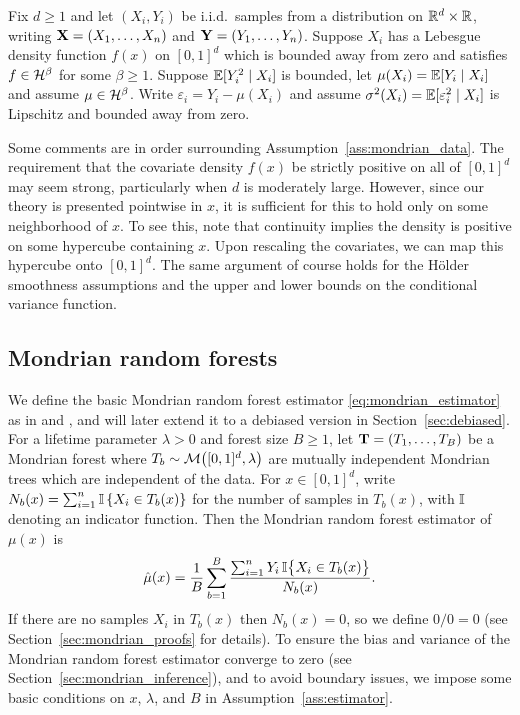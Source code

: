 \begin{assumption}%
  \label{ass:mondrian_data}

  Fix $d \geq 1$ and let $(X_i, Y_i)$ be i.i.d.\ samples from a distribution on
  $\mathbb{R}^d \times \mathbb{R}$, writing $\mathbf{X} = (X_1, \ldots, X_n)$ and
  $\mathbf{Y} = (Y_1, \ldots, Y_n)$. Suppose $X_i$ has a Lebesgue density function
  $f(x)$ on $[0,1]^d$ which is bounded away from zero and satisfies
  $f \in \mathcal{H}^\beta$ for some $\beta \geq 1$. Suppose $\mathbb{E}[Y_i^2 \mid X_i]$ is
  bounded, let $\mu(X_i) = \mathbb{E}[Y_i \mid X_i]$ and assume $\mu \in \mathcal{H}^\beta$.
  Write $\varepsilon_i = Y_i - \mu(X_i)$ and assume
  $\sigma^2(X_i) = \mathbb{E}[\varepsilon_i^2 \mid X_i]$
  is Lipschitz and bounded away from zero.

\end{assumption}

Some comments are in order surrounding Assumption~\ref{ass:mondrian_data}. The
requirement that the covariate density $f(x)$ be strictly positive on all of
$[0,1]^d$ may seem strong, particularly when $d$ is moderately large. However,
since our theory is presented pointwise in $x$, it is sufficient for this to
hold only on some neighborhood of $x$. To see this, note that continuity
implies the density is positive on some hypercube containing $x$. Upon
rescaling the covariates, we can map this hypercube onto $[0,1]^d$. The same
argument of course holds for the H{\"o}lder smoothness assumptions and the
upper and lower bounds on the conditional variance function.

\subsection{Mondrian random forests}

We define the basic Mondrian random forest estimator
\eqref{eq:mondrian_estimator} as in \citet{lakshminarayanan2014mondrian} and
\citet{mourtada2020minimax}, and will later extend it to a debiased version in
Section~\ref{sec:debiased}. For a lifetime parameter $\lambda > 0$ and forest
size $B \geq 1$, let $\mathbf{T} = (T_1, \ldots, T_B)$ be a Mondrian forest where
$T_b \sim \mathcal{M}\big([0,1]^d, \lambda\big)$ are mutually independent Mondrian trees
which are independent of the data. For $x \in [0,1]^d$, write
$N_b(x) = \sum_{i=1}^{n} \mathbb{I} \left\{ X_i \in T_b(x) \right\}$ for the number of
samples in $T_b(x)$, with $\mathbb{I}$ denoting an indicator function. Then the
Mondrian random forest estimator of $\mu(x)$ is
%
\begin{align}
  \label{eq:mondrian_estimator}
  \hat\mu(x) = \frac{1}{B} \sum_{b=1}^B
  \frac{\sum_{i=1}^n Y_i \, \mathbb{I}\big\{ X_i \in T_b(x) \big\}} {N_b(x)}.
\end{align}
%
If there are no samples $X_i$ in $T_b(x)$ then $N_b(x) = 0$, so we define
$0/0 = 0$ (see Section~\ref{sec:mondrian_proofs} for details). To ensure the
bias and variance of the Mondrian random forest estimator converge to zero (see
Section~\ref{sec:mondrian_inference}), and to avoid boundary issues, we impose
some basic conditions on $x$, $\lambda$, and $B$ in
Assumption~\ref{ass:estimator}.

